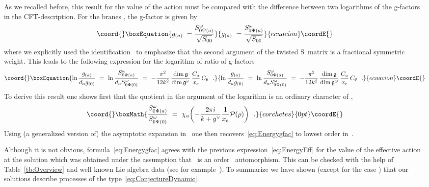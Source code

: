 \documentclass[12pt,a4paper]{article}
\providecommand{\embin}{{\hookrightarrow}}
\providecommand{\mf}{\mathfrak} %
\providecommand{\mc}{\mathcal} %
\def\Iso{\Psi}
\def\iG{G^\omega} %
\def\ig{\mf{g}^\omega} %
\def\bL{\mc{B}} %
\def\treps{\bL^\omega} %
\begin{document}
As we recalled before, this result for the value of the action must 
be compared with the difference between two logarithms of the 
g-factors~\cite{Affleck:1991tk} in the CFT-description. For the 
branes \coordHE{}, the g-factor is given by \cite[eq.\ (4.2)]{Behrend:1999bn}
\begin{equation}\coord{}\boxEquation{
g_{(a)}\ = \frac{S_{0\Iso(a)}^\omega}{\sqrt{S_{00}}}
}{
g_{(a)}\ = \frac{S_{0\Iso(a)}^\omega}{\sqrt{S_{00}}}
}{ecuacion}\coordE{}\end{equation}
where we explicitly used the identification~\myHighlight{$\Iso:P_{\iG}^+\to\treps$}\coordHE{} 
to emphasize that the second argument of the twisted S~matrix is a 
fractional symmetric weight. This leads to the following 
expression for the logarithm of ratio of g-factors  
\begin{equation}\coord{}\boxEquation{
  \label{eq:Energygfac}
  \ln\frac{g_{(a)}}{d_ag_{(0)}}
  \ = \ \ln\frac{S_{0\Iso(a)}^\omega}{d_aS_{0\Iso (0)}^\omega}
  \ =\ -\frac{\pi^2}{12k^2}\,\frac{\dim\mf{g}}{\dim\ig}\,\frac{C_a}{x_{e}}\,C_\theta\ \ .
}{
  \ln\frac{g_{(a)}}{d_ag_{(0)}}
  \ = \ \ln\frac{S_{0\Iso(a)}^\omega}{d_aS_{0\Iso (0)}^\omega}
  \ =\ -\frac{\pi^2}{12k^2}\,\frac{\dim\mf{g}}{\dim\ig}\,\frac{C_a}{x_{e}}\,C_\theta\ \ .
}{ecuacion}\coordE{}\end{equation}
To derive this result one shows first
that the quotient in the argument of the
logarithm is an ordinary character of \myHighlight{$\ig$}\coordHE{},
\[\coord{}\boxMath{
  \frac{S^{\omega}_{0\Iso(a)}}{S^{\omega}_{0\Iso (0)}}\ = \
  \chi_a\biggl(-\frac{2\pi i}{k+g^\vee}\frac{1}{x_e}\mc{P}(\rho)\biggr) \ \ .
}{corchetes}{0pt}\coordE{}\]
Using (a generalized
version of) the asymptotic expansion in~\cite[eq.\ (13.175)]{FrancescoCFT}
one then  recovers~\eqref{eq:Energygfac} to lowest order in~\coordHE{}.
\smallskip

Although it is not obvious, formula~\eqref{eq:Energygfac} agrees with 
the previous expression~\eqref{eq:EnergyEff} for the value of the 
effective action at the solution which was obtained under the 
assumption that~\myHighlight{$\omega$}\coordHE{} is an order~\coordHE{} automorphism. 
This can be checked with the help of Table~\ref{tb:Overview} and well 
known Lie algebra data (see for example~\cite[p.\ 44]{Fuchs:1995}).
To summarize we have shown (except for the case \myHighlight{$G_2\embin D_4$}\coordHE{}) that
our solutions describe processes of the type~\eqref{eq:ConjectureDynamic}.
\end{document}
